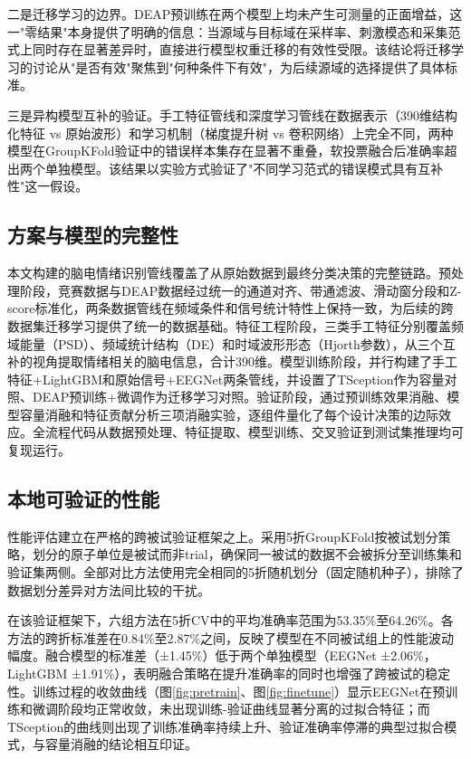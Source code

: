 \documentclass[UTF8,zihao=-4,fontset=windows]{ctexart}
\numberwithin{equation}{section}
\numberwithin{figure}{section}
\numberwithin{table}{section}
\begin{document}
二是迁移学习的边界。DEAP预训练在两个模型上均未产生可测量的正面增益，这一"零结果"本身提供了明确的信息：当源域与目标域在采样率、刺激模态和采集范式上同时存在显著差异时，直接进行模型权重迁移的有效性受限。该结论将迁移学习的讨论从"是否有效"聚焦到"何种条件下有效"，为后续源域的选择提供了具体标准。

三是异构模型互补的验证。手工特征管线和深度学习管线在数据表示（390维结构化特征 vs 原始波形）和学习机制（梯度提升树 vs 卷积网络）上完全不同，两种模型在GroupKFold验证中的错误样本集存在显著不重叠，软投票融合后准确率超出两个单独模型。该结果以实验方式验证了"不同学习范式的错误模式具有互补性"这一假设。

\subsection{方案与模型的完整性}

本文构建的脑电情绪识别管线覆盖了从原始数据到最终分类决策的完整链路。预处理阶段，竞赛数据与DEAP数据经过统一的通道对齐、带通滤波、滑动窗分段和Z-score标准化，两条数据管线在频域条件和信号统计特性上保持一致，为后续的跨数据集迁移学习提供了统一的数据基础。特征工程阶段，三类手工特征分别覆盖频域能量（PSD）、频域统计结构（DE）和时域波形形态（Hjorth参数），从三个互补的视角提取情绪相关的脑电信息，合计390维。模型训练阶段，并行构建了手工特征+LightGBM和原始信号+EEGNet两条管线，并设置了TSception作为容量对照、DEAP预训练+微调作为迁移学习对照。验证阶段，通过预训练效果消融、模型容量消融和特征贡献分析三项消融实验，逐组件量化了每个设计决策的边际效应。全流程代码从数据预处理、特征提取、模型训练、交叉验证到测试集推理均可复现运行。

\subsection{本地可验证的性能}

性能评估建立在严格的跨被试验证框架之上。采用5折GroupKFold按被试划分策略，划分的原子单位是被试而非trial，确保同一被试的数据不会被拆分至训练集和验证集两侧。全部对比方法使用完全相同的5折随机划分（固定随机种子），排除了数据划分差异对方法间比较的干扰。

在该验证框架下，六组方法在5折CV中的平均准确率范围为53.35\%至64.26\%。各方法的跨折标准差在0.84\%至2.87\%之间，反映了模型在不同被试组上的性能波动幅度。融合模型的标准差（±1.45\%）低于两个单独模型（EEGNet ±2.06\%，LightGBM ±1.91\%），表明融合策略在提升准确率的同时也增强了跨被试的稳定性。训练过程的收敛曲线（图\ref{fig:pretrain}、图\ref{fig:finetune}）显示EEGNet在预训练和微调阶段均正常收敛，未出现训练-验证曲线显著分离的过拟合特征；而TSception的曲线则出现了训练准确率持续上升、验证准确率停滞的典型过拟合模式，与容量消融的结论相互印证。
\end{document}

